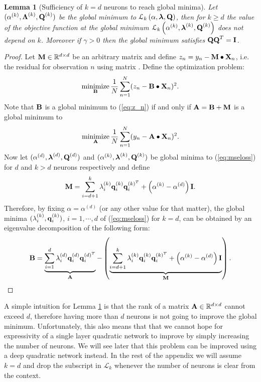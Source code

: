 \documentclass[11pt]{article}
\theoremstyle{plain}
\newtheorem{lemma}{Lemma}
\DeclareMathOperator*{\minimize}{minimize}
\def\R{\mathbb{R}}
\theoremstyle{plain}
\numberwithin{equation}{section}
\numberwithin{lemma}{section}
\numberwithin{theorem}{section}
\numberwithin{corollary}{section}
\numberwithin{observation}{section}
\numberwithin{definition}{section}
\numberwithin{example}{section}
\begin{document}
\begin{lemma}[Sufficiency of $k =d$ neurons to reach global minima] \label{lem:k_equals_d}
Let $(\alpha^{(k)},\Mx{\Lambda}^{(k)},\Mx{Q}^{(k)})$ be the global minimum to $\mathcal{L}_k\left(\alpha, \V{\lambda}, \Mx{Q} \right)$, then for $k\geq d$ the value of the objective function at the global minimum $\mathcal{L}_k\left(\alpha^{(k)}, \V{\lambda}^{(k)}, \Mx{Q}^{(k)} \right)$ does not depend on $k$. Moreover if $\gamma > 0 $ then the global minimum satisfies $\Mx{QQ}^T = \Mx{I}$. 
\end{lemma}
\begin{proof}
Let $\Mx{M} \in \R^{d \times d}$ be an arbitrary matrix and define $z_n = y_n -\Mx{M} \bullet \Mx{X}_n$, i.e. the residual for observation $n$ using matrix . Define the optimization problem:
\begin{align} \label{eq:z_n}
    \minimize_{\Mx{B}} \frac{1}{N}\sum_{n=1}^N (z_n - \Mx{B} \bullet \Mx{X}_n)^2.
\end{align}
Note that $\Mx{B}$ is a global minimum to (\ref{eq:z_n}) if and only if $\Mx{A} = \Mx{B} + \Mx{M}$ is a global minimum to 
\begin{align}
    \minimize_{\Mx{A}} \frac{1}{N}\sum_{n=1}^N (y_n - \Mx{A} \bullet \Mx{X}_n)^2.
\end{align}
Now let $(\alpha^{(d)},\V{\lambda}^{(d)}, \Mx{Q}^{(d)})$ and $(\alpha^{(k)},\V{\lambda}^{(k)}, \Mx{Q}^{(k)})$ be global minima to (\ref{eq:mseloss}) for $d$ and $k>d$ neurons respectively and define 
\[
\Mx{M} = \sum_{i = d+1}^k \lambda_i^{(k)} \V{q}_i^{(k)}\V{q}_i^{(k)^T}+ \left(\alpha^{(k)}-\alpha^{(d)}\right) \Mx{I}.
\]
Therefore, by fixing $\alpha = \alpha^{(d)}$ (or any other value for that matter), the global minima $(\lambda_i^{(k)}, \V{q}_i^{(k)})$, $i = 1, \cdots, d$ of (\ref{eq:mseloss}) for $k = d$, can be obtained by an eigenvalue decomposition of the following form:
\[
\Mx{B} = \underbrace{\sum_{i = 1}^d \lambda_i^{(d)} \V{q}_i^{(d)} \V{q}_i^{(d)^T}}_{\Mx{A}}-\left(\underbrace{\sum_{i = d+1}^k \lambda_i^{(k)} \V{q}_i^{(k)} \V{q}_i^{(k)^T} + \left(\alpha^{(k)}-\alpha^{(d)}\right) \Mx{I} }_{\Mx{M}}\right).
\]
\end{proof}

A simple intuition for Lemma \ref{lem:k_equals_d} is that the rank of a matrix $\Mx{A} \in \R^{d \times d}$ cannot exceed $d$, therefore having more than $d$ neurons is not going to improve the global minimum. Unfortunately, this also means that that we cannot hope for expressivity of a single layer quadratic network to improve by simply increasing the number of neurons. We will see later that this problem can be improved using a deep quadratic network instead.
In the rest of the appendix we will assume $k = d$ and drop the subscript in $\mathcal{L}_k$ whenever the number of neurons is clear from the context.
\end{document}
